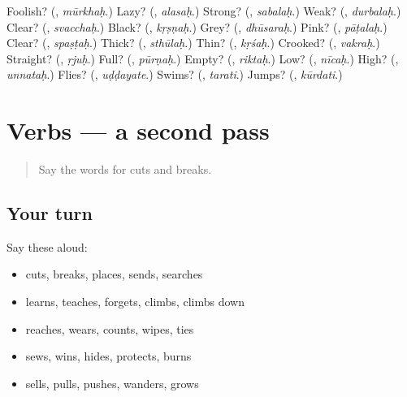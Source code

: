 \begin{tcolorbox}[breakable,colback=teal!4,colframe=teal!35!black,title={Before you move on}]
Foolish? (\textbf{}, \emph{mūrkhaḥ}.) Lazy? (\textbf{}, \emph{alasaḥ}.) Strong? (\textbf{}, \emph{sabalaḥ}.) Weak? (\textbf{}, \emph{durbalaḥ}.) Clear? (\textbf{}, \emph{svacchaḥ}.) Black? (\textbf{}, \emph{kṛṣṇaḥ}.) Grey? (\textbf{}, \emph{dhūsaraḥ}.) Pink? (\textbf{}, \emph{pāṭalaḥ}.) Clear? (\textbf{}, \emph{spaṣṭaḥ}.) Thick? (\textbf{}, \emph{sthūlaḥ}.) Thin? (\textbf{}, \emph{kṛśaḥ}.) Crooked? (\textbf{}, \emph{vakraḥ}.) Straight? (\textbf{}, \emph{ṛjuḥ}.) Full? (\textbf{}, \emph{pūrṇaḥ}.) Empty? (\textbf{}, \emph{riktaḥ}.) Low? (\textbf{}, \emph{nīcaḥ}.) High? (\textbf{}, \emph{unnataḥ}.) Flies? (\textbf{}, \emph{uḍḍayate}.) Swims? (\textbf{}, \emph{tarati}.) Jumps? (\textbf{}, \emph{kūrdati}.)
\end{tcolorbox}
\section[(dialogue)]{Verbs — a second pass}

\label{lesson:SA-R138-second-pass-verbs}



\begin{quote}
Say the words for cuts and breaks.
\end{quote}

\subsection*{Your turn}
Say these aloud:

\begin{itemize}
\raggedright
  \item cuts, breaks, places, sends, searches
  \item learns, teaches, forgets, climbs, climbs down
  \item reaches, wears, counts, wipes, ties
  \item sews, wins, hides, protects, burns
  \item sells, pulls, pushes, wanders, grows
\end{itemize}

